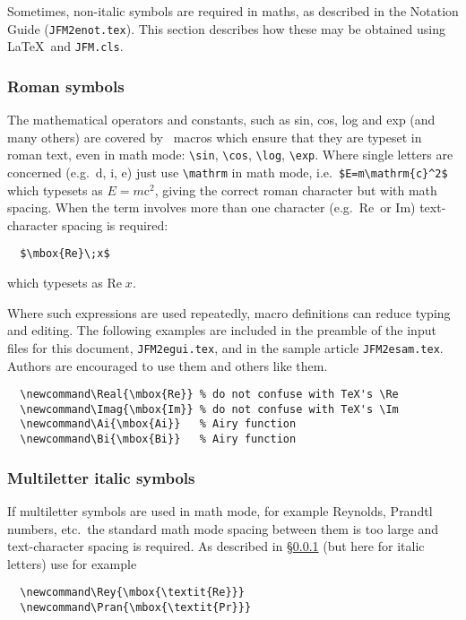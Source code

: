 \documentclass{jfm}
\newcommand\Real{\mbox{Re}} %
\newcommand\Imag{\mbox{Im}} %
\newcommand\Rey{\mbox{\textit{Re}}}  %
\newcommand\Pran{\mbox{\textit{Pr}}} %
\newcommand\Ai{\mbox{Ai}}            %
\newcommand\Bi{\mbox{Bi}}            %
\newcommand\etc{etc.\ }
\newcommand\eg{e.g.\ }
\begin{document}
Sometimes, non-italic symbols are required in maths, as described in the
Notation Guide (\verb"JFM2enot.tex"). This section describes how these may
be obtained using \LaTeX\ and \verb"JFM.cls".

\subsubsection{Roman symbols}\label{roman}

The mathematical operators and constants, such as sin, cos, log and exp
(and many others) are covered by \LaTeXe\ macros which ensure that they are
typeset in roman text, even in math mode: \verb"\sin", \verb"\cos",
\verb"\log", \verb"\exp". Where single letters are concerned (\eg d, i, e)
just use \verb"\mathrm" in math mode, i.e.\ \verb"$E=m\mathrm{c}^2$" which
typesets as $E=m\mathrm{c}^2$, giving the correct roman character but with
math spacing. When the term involves more than one character (\eg \Real\ or
\Imag ) text-character spacing is required:
%
\begin{verbatim}
  $\mbox{Re}\;x$
\end{verbatim}
%
which typesets as $\Real\;x$.

Where such expressions are used repeatedly, macro definitions can reduce
typing and editing. The following examples are included in the preamble
of the input files for this document, \verb"JFM2egui.tex", and in the
sample article \verb"JFM2esam.tex". Authors are encouraged to use them
and others like them.
%
\begin{verbatim}
  \newcommand\Real{\mbox{Re}} % do not confuse with TeX's \Re
  \newcommand\Imag{\mbox{Im}} % do not confuse with TeX's \Im
  \newcommand\Ai{\mbox{Ai}}   % Airy function
  \newcommand\Bi{\mbox{Bi}}   % Airy function
\end{verbatim}

\subsubsection{Multiletter italic symbols}

If multiletter symbols are used in math mode, for example Reynolds,
Prandtl numbers, \etc the standard math mode spacing between them is
too large and text-character spacing is required. As described
in \S\ref{roman} (but here for italic letters) use for example
%
\begin{verbatim}
  \newcommand\Rey{\mbox{\textit{Re}}}
  \newcommand\Pran{\mbox{\textit{Pr}}}
\end{verbatim}
\end{document}
